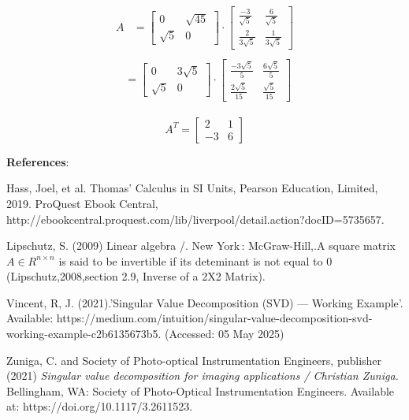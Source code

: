 \documentclass[a4paper]{report}
\begin{document}
\begin{align*}
    \begin{split}
        A&=\begin{bmatrix}
    0&\sqrt{45}\\ \sqrt{5}&0
\end{bmatrix}\cdot\begin{bmatrix}
    \frac{-3}{\sqrt{5}}&\frac{6}{\sqrt{5}}\\ \frac{2}{3\sqrt{5}}&\frac{1}{3\sqrt{5}}
\end{bmatrix}
    \end{split} \\
    \begin{split}
        &=\begin{bmatrix}
    0&3\sqrt{5}\\ \sqrt{5}&0
\end{bmatrix}\cdot\begin{bmatrix}
    \frac{-3\sqrt{5}}{5}&\frac{6\sqrt{5}}{5}\\ \frac{2\sqrt{5}}{15}&\frac{\sqrt{5}}{15}
\end{bmatrix}
    \end{split}
\end{align*}

\begin{equation}
    \boxed{ A^T=\begin{bmatrix}
    2&1\\-3&6
\end{bmatrix}}
\end{equation}


\newpage
\textbf{References}:

Hass, Joel, et al. Thomas' Calculus in SI Units, Pearson Education, Limited, 2019. ProQuest Ebook Central, http://ebookcentral.proquest.com/lib/liverpool/detail.action?docID=5735657.

Lipschutz, S. (2009) Linear algebra /. New York : McGraw-Hill,.A square matrix $A \in R^{n\times n}$ is said to be invertible if its deteminant is not equal to 0 (Lipschutz,2008,section 2.9, Inverse of a 2X2 Matrix).

Vincent, R, J. (2021).’Singular Value Decomposition (SVD) — Working Example’. \newline Available: https://medium.com/intuition/singular-value-decomposition-svd-working-example-c2b6135673b5. (Accessed: 05 May 2025)


Zuniga, C. and Society of Photo-optical Instrumentation Engineers, publisher (2021) \textit{Singular value decomposition for imaging applications / Christian Zuniga.} Bellingham, WA: Society of Photo-Optical Instrumentation Engineers. Available at: https://doi.org/10.1117/3.2611523.
\end{document}
